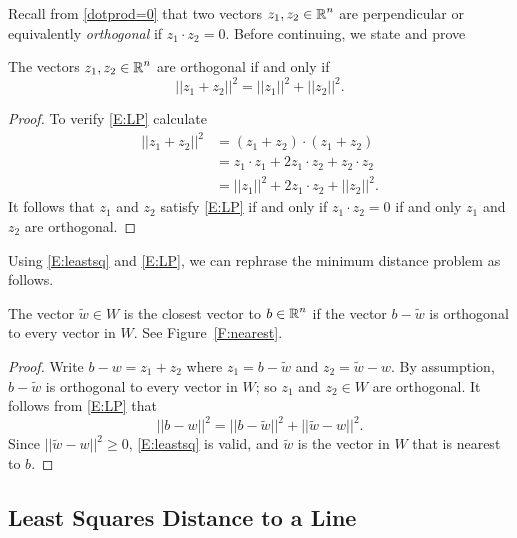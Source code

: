 \documentclass{ximera}
\begin{document}
Recall from \eqref{dotprod=0} that two vectors $z_1,z_2\in\mbox{$\mathbb{R}$}^n$ are perpendicular 
or equivalently {\em orthogonal} if $z_1\cdot z_2 = 0$.  Before continuing, we state and prove 
\begin{lemma}   \label{L:LP}
The vectors $z_1,z_2\in\mbox{$\mathbb{R}$}^n$ are orthogonal if and only if  
\begin{equation} \label{E:LP}
||z_1+z_2||^2 = ||z_1||^2 + ||z_2||^2.
\end{equation}
\end{lemma}

\begin{proof}
To verify \eqref{E:LP} calculate 
\begin{align*}
  ||z_1+z_2||^2&=(z_1+z_2)\cdot(z_1+z_2) \\
  &=z_1\cdot z_1 +2z_1\cdot z_2+z_2\cdot z_2 \\
  &=||z_1||^2 + 2z_1\cdot z_2 +||z_2||^2.
\end{align*}
It follows that $z_1$ and $z_2$ satisfy \eqref{E:LP} if and only if $z_1\cdot z_2 = 0$  
if and only $z_1$ and $z_2$ are orthogonal.
\end{proof}

Using \eqref{E:leastsq} and \eqref{E:LP}, we can rephrase the minimum distance 
problem as follows.
\begin{lemma}  \label{L:orthoLSA}
The vector $\tilde{w}\in W$ is the closest vector to $b\in\mbox{$\mathbb{R}$}^n$ if the vector 
$b - \tilde{w}$ is orthogonal to every vector in $W$. See Figure~\ref{F:nearest}.
\end{lemma}

\begin{proof}  Write $b-w=z_1+z_2$ where $z_1=b-\tilde{w}$ and $z_2=\tilde{w}-w$.  By 
assumption, $b-\tilde{w}$ is orthogonal to every vector in $W$; so $z_1$ and 
$z_2\in W$ are orthogonal.  It follows from \eqref{E:LP} that
\[
||b-w||^2 = ||b-\tilde{w}||^2 + ||\tilde{w}-w||^2.
\]
Since $||\tilde{w}-w||^2\ge 0$, \eqref{E:leastsq} is valid, and $\tilde{w}$ is the 
vector in $W$ that is nearest to $b$. 
\end{proof}

\subsection*{Least Squares Distance to a Line}
\end{document}
